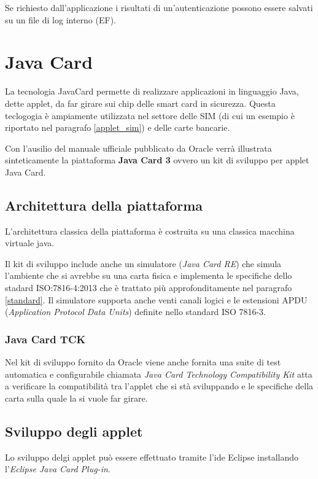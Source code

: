 Se richiesto dall'applicazione i risultati di un'autenticazione possono essere salvati su un file di log interno (EF).
\cite{isoiec3}

\section{Java Card}
\label{java_card}
La tecnologia JavaCard permette di realizzare applicazioni in linguaggio Java, dette applet, da far girare sui chip delle smart card in sicurezza. Questa teclogogia è ampiamente utilizzata nel settore delle SIM (di cui un esempio è riportato nel paragrafo \ref{applet_sim}) e delle carte bancarie.
\cite{Wiki_java}

Con l'ausilio del manuale ufficiale pubblicato da Oracle \cite{javacard3platform} verrà illustrata sinteticamente la piattaforma \textbf{Java Card 3} ovvero un kit di sviluppo per applet Java Card.
\subsection{Architettura della piattaforma}
L'architettura classica della piattaforma è costruita su una classica macchina virtuale java.

Il kit di sviluppo include anche un simulatore (\textit{Java Card RE}) che simula l'ambiente che si avrebbe su una carta fisica e implementa le specifiche dello stadard ISO:7816-4:2013 che è trattato più approfonditamente nel paragrafo \ref{standard}. Il simulatore supporta anche venti canali logici e le estensioni APDU (\textit{Application Protocol Data Units}) definite nello standard ISO 7816-3.
\subsubsection{Java Card TCK}
Nel kit di sviluppo fornito da Oracle viene anche fornita una suite di test automatica e configurabile chiamata \textit{Java Card Technology Compatibility Kit} atta a verificare la compatibilità tra l'applet che si stà sviluppando e le specifiche della carta sulla quale la si vuole far girare.

\subsection{Sviluppo degli applet}
Lo sviluppo delgi applet può essere effettuato tramite l'ide Eclipse installando l'\textit{Eclipse Java Card Plug-in}.

